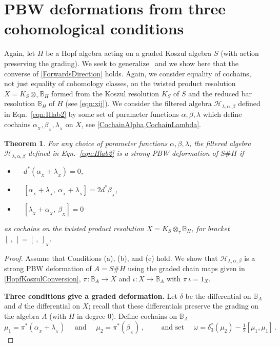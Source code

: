 \documentclass[11pt]{amsart}
\numberwithin{equation}{section}
\newtheorem{thm}[equation]{Theorem}
\newcommand{\X}{_X}
\newcommand{\alphax}{\alpha_{\X}}
\newcommand{\betax}{\beta_{\X}}
\newcommand{\lambdax}{\lambda_{\X}}
\newcommand{\A}{A}%
\newcommand{\chabl}{\cH_{\lambda,\alpha,\beta}}
\newcommand{\chlab}{\cH_{\lambda,\alpha,\beta}}
\newcommand{\sA}{A }
\newcommand{\BB}{\mathbb{B}} %
\renewcommand{\_}[1]{\mbox{$_{\left( #1 \right)}$}}
\newcommand{\ott}{\otimes_{\tau}}
\newcommand{\Ho}{H}%
\newcommand{\cH}{\mathcal{H}}
\begin{document}
{\section{PBW deformations from three cohomological conditions}
\label{sec:PBWFromThree}

Again, let $\Ho$ be a Hopf algebra acting
on a graded Koszul algebra $S$ (with action preserving the grading).
We seek to generalize~\cite[Theorem 5.3]{SW-Koszul}
and we show here that the converse of \cref{ForwardsDirection} 
holds.
Again, we consider equality of
cochains, not just equality of cohomology classes,
on the twisted product resolution $X=K_S\ott \BB_\Ho$
formed from the Koszul resolution 
  $K_S$ of $S$ and the reduced bar resolution $\BB_\Ho$
  of $H$  (see \cref{eqn:xij}).
We 
consider the filtered algebra $\chabl$ defined in 
Eqn.~\eqref{eqn:Hlab2} by some set of parameter functions 
$\alpha,\beta,\lambda$
which define cochains $\alphax, \betax, \lambdax$ on $X$, 
see \cref{CochainAlpha,CochainLambda}.


\vspace{2ex}

  \begin{thm}\label{BackwardsDirection}
For any choice of parameter functions $\alpha,\beta,\lambda$, 
the filtered algebra $\chabl$ defined in 
Eqn.~\eqref{eqn:Hlab2} is a strong
PBW deformation of $S\# \Ho$
if
   \begin{itemize}
    \item[(a)]\ \ $d^*(\alphax+\lambdax) = 0$, 
    \item[(b)]\ \ $[\alphax+\lambdax, \ \alphax + \lambdax]=2d^*\betax$, 
    \item[(c)]\ \ $[\lambdax + \alphax,\  \betax]= 0$ 
  \end{itemize}
  as cochains on the twisted product resolution 
$X=K_S\ott \BB_\Ho$, for bracket $[\ ,\ ]=[\ ,  \ ]_{\X}$.
\end{thm}

\vspace{1ex}

\begin{proof}
Assume that Conditions (a), (b), and (c) hold.
We show that $\chlab$ is a strong PBW deformation of $\A=S\# \Ho$
using the
graded chain maps given in
\cref{HopfKoszulConversion},
$\pi: \BB_A\rightarrow X$ and 
$\iota: X\rightarrow \BB_A$
with $\pi \, \iota =1_X$.


{\bf Three conditions give a graded deformation.}
Let $\delta$ be the differential on $\BB_A$ and $d$ the differential
on $X$; recall that these differentials preserve the
grading on the algebra $A$ (with $H$ in degree 0). 
Define cochains on $\BB_A$
$$\mu_1=\pi^*(\alphax + \lambdax)
\quad\text{ and }\quad \mu_2=\pi^*(\betax)\, ,
\qquad\text{ and set }\quad
\omega
=\delta_3^*(\mu_2)-\tfrac{1}{2}[\mu_1,\mu_1]
  \,  . 
  $$


\end{proof}}
\end{document}

